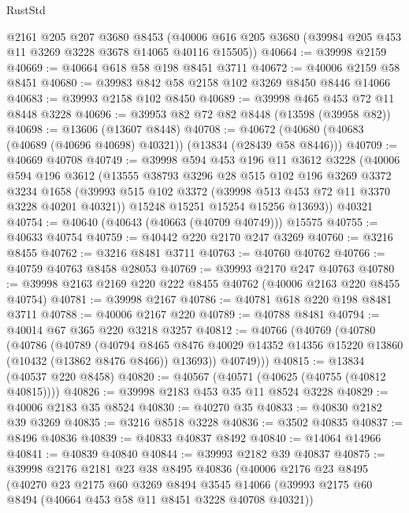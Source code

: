 \begin{lexlean}{RustStd}
\begin{coremodule}
    @2161
    @205
    @207
    @3680
    @8453
    (@40006 @616 @205 @3680 (@39984 @205 @453 @11 @3269 @3228 @3678 @14065 @40116 @15505))
@40664 := @39998 @2159
@40669 := @40664 @618 @58 @198 @8451 @3711
@40672 := @40006 @2159 @58 @8451
@40680 := @39983 @842 @58 @2158 @102 @3269 @8450 @8446 @14066
@40683 := @39993 @2158 @102 @8450
@40689 := @39998 @465 @453 @72 @11 @8448 @3228
@40696 := @39953 @82 @72 @82 @8448 (@13598 (@39958 @82))
@40698 := @13606 (@13607 @8448)
@40708 := @40672 (@40680 (@40683 (@40689 (@40696 @40698) @40321)) (@13834 (@28439 @58 @8446)))
@40709 := @40669 @40708
@40749 := @39998
    @594
    @453
    @196
    @11
    @3612
    @3228
    (@40006
      @594
      @196
      @3612
      (@13555
        @38793
        @3296
        @28
        @515
        @102
        @196
        @3269
        @3372
        @3234
        @1658
        (@39993 @515 @102 @3372 (@39998 @513 @453 @72 @11 @3370 @3228 @40201 @40321))
        @15248
        @15251
        @15254
        @15256
        @13693))
    @40321
@40754 := @40640 (@40643 (@40663 (@40709 @40749))) @15575
@40755 := @40633 @40754
@40759 := @40442 @220 @2170 @247 @3269
@40760 := @3216 @8455
@40762 := @3216 @8481 @3711
@40763 := @40760 @40762
@40766 := @40759 @40763 @8458 @28053
@40769 := @39993 @2170 @247 @40763
@40780 := @39998 @2163 @2169 @220 @222 @8455 @40762 (@40006 @2163 @220 @8455 @40754)
@40781 := @39998 @2167
@40786 := @40781 @618 @220 @198 @8481 @3711
@40788 := @40006 @2167 @220
@40789 := @40788 @8481
@40794 := @40014 @67 @365 @220 @3218 @3257
@40812 := @40766
    (@40769
      (@40780
        (@40786
          (@40789
            (@40794
              @8465
              @8476
              @40029
              @14352
              @14356
              @15220
              @13860
              (@10432 (@13862 @8476 @8466))
              @13693))
          @40749)))
@40815 := @13834 (@40537 @220 @8458)
@40820 := @40567 (@40571 (@40625 (@40755 (@40812 @40815))))
@40826 := @39998 @2183 @453 @35 @11 @8524 @3228
@40829 := @40006 @2183 @35 @8524
@40830 := @40270 @35
@40833 := @40830 @2182 @39 @3269
@40835 := @3216 @8518 @3228
@40836 := @3502 @40835
@40837 := @8496 @40836
@40839 := @40833 @40837 @8492
@40840 := @14064 @14966
@40841 := @40839 @40840
@40844 := @39993 @2182 @39 @40837
@40875 := @39998
    @2176
    @2181
    @23
    @38
    @8495
    @40836
    (@40006
      @2176
      @23
      @8495
      (@40270
        @23
        @2175
        @60
        @3269
        @8494
        @3545
        @14066
        (@39993 @2175 @60 @8494 (@40664 @453 @58 @11 @8451 @3228 @40708 @40321))

\end{coremodule}
\end{lexlean}
